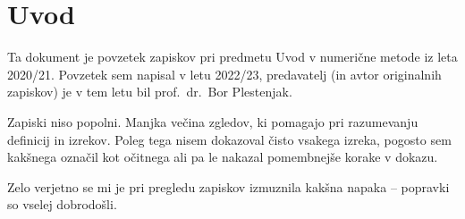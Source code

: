 \section*{Uvod}

Ta dokument je povzetek zapiskov pri predmetu Uvod v numerične
metode iz leta 2020/21. Povzetek sem napisal v letu 2022/23,
predavatelj (in avtor originalnih zapiskov) je v tem letu bil
prof.~dr.~Bor Plestenjak.

Zapiski niso popolni. Manjka večina zgledov, ki pomagajo pri razumevanju definicij in izrekov. Poleg tega nisem dokazoval čisto vsakega izreka, pogosto sem kakšnega označil kot očitnega ali pa le nakazal pomembnejše korake v dokazu.

Zelo verjetno se mi je pri pregledu zapiskov izmuznila kakšna napaka -- popravki so vselej dobrodošli.